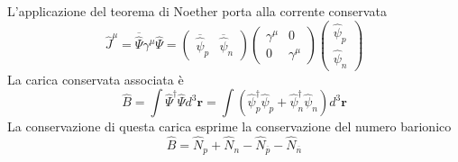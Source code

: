 L'applicazione del teorema di Noether porta alla corrente conservata
$$
\widehat{J}^\mu = \overline{\widehat{\Psi}} \gamma^\mu \widehat{\Psi} = \begin{pmatrix} \overline{\widehat{\psi}}_p & \overline{\widehat{\psi}}_n \end{pmatrix} \begin{pmatrix} \gamma^\mu & 0 \\ 0 & \gamma^\mu \end{pmatrix} \begin{pmatrix} \widehat{\psi}_p \\ \widehat{\psi}_n \end{pmatrix}
$$
La carica conservata associata è
$$
\widehat{B} = \int \widehat{\Psi}^\dagger \widehat{\Psi} d^3\mathbf{r} = \int \left( \widehat{\psi}_p^\dagger \widehat{\psi}_p + \widehat{\psi}_n^\dagger \widehat{\psi}_n \right) d^3\mathbf{r}
$$
La conservazione di questa carica esprime la conservazione del numero barionico
$$
\widehat{B} = \widehat{N}_p + \widehat{N}_n - \widehat{N}_{\overline{p}} - \widehat{N}_{\overline{n}}
$$